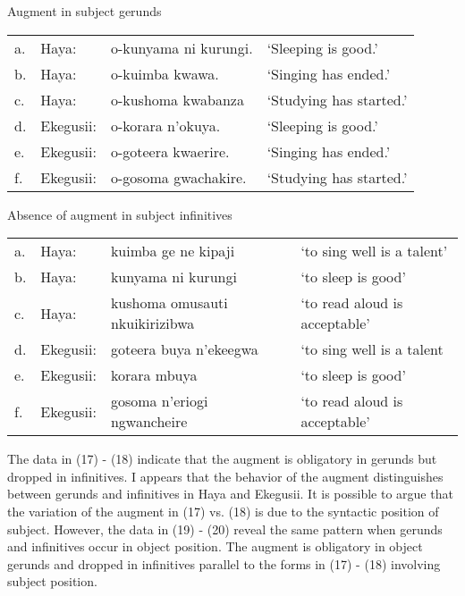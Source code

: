 \documentclass[output=paper]{langscibook}
\begin{document}
\begin{exe}
\ex Augment in subject gerunds\\
\label{hayagusii17}
\begin{tabular}{llll}
  a. &	Haya: 	&	o-kunyama ni kurungi. &	‘Sleeping is good.’	\\	
b. &	Haya: 	&	o-kuimba kwawa.	&	‘Singing has ended.’\\		
c. &	Haya: 	&	o-kushoma kwabanza	&	‘Studying has started.’	\\
d. &	Ekegusii: & 	o-korara n’okuya.	&	‘Sleeping is good.’\\
e. &	Ekegusii: &	o-goteera kwaerire.	&	‘Singing has ended.’\\
f. &	Ekegusii: &	o-gosoma gwachakire. &	‘Studying has started.’\\
\end{tabular}

\ex Absence of augment in subject infinitives\\
\label{hayagusii18}
\begin{tabular}{llll}
 a. &	Haya:	    &	kuimba ge ne kipaji		&	‘to sing well is a talent’\\
b. &	Haya:	    &	kunyama ni kurungi		&	‘to sleep is good’\\
c. &	Haya:	    &	kushoma omusauti nkuikirizibwa&	‘to read aloud is acceptable’\\
d. &	Ekegusii: &	goteera buya n’ekeegwa	&	‘to sing well is a talent\\
e. &	Ekegusii: &	korara mbuya			&	‘to sleep is good’\\
f. &	Ekegusii: &	gosoma n’eriogi ngwancheire	&	‘to read aloud is acceptable’\\
\end{tabular}
\end{exe}
The data in (17) - (18) indicate that the augment is obligatory in gerunds but dropped in infinitives. I appears that the behavior of the augment distinguishes between gerunds and infinitives in Haya and Ekegusii. It is possible to argue that the variation of the augment in (17) vs. (18) is due to the syntactic position of subject. However, the data in (19) - (20) reveal the same pattern when gerunds and infinitives occur in object position. The augment is obligatory in object gerunds and dropped in infinitives parallel to the forms in (17) - (18) involving subject position.
\end{document}
